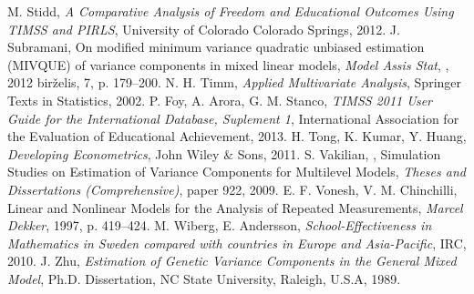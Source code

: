 \documentclass[11pt,a4paper]{article}
\begin{document}
\begin{thebibliography}{1}
 M. Stidd, \textit{A Comparative Analysis of Freedom and Educational Outcomes Using TIMSS and PIRLS}, University of Colorado Colorado Springs, 2012.
J. Subramani, On modified minimum variance quadratic unbiased estimation (MIVQUE) of variance components in mixed linear models, \textit{Model Assis Stat}, , 2012 birželis, 7, p. 179–200.
N. H. Timm, \textit{Applied Multivariate Analysis}, Springer Texts in Statistics, 2002.
 P. Foy, A. Arora, G. M. Stanco, \textit{TIMSS 2011 User Guide for the International Database, Suplement 1}, International Association for the Evaluation of Educational Achievement, 2013.
H. Tong, K. Kumar, Y. Huang, \textit{Developing Econometrics}, John Wiley \& Sons, 2011.
 S. Vakilian, , Simulation Studies on Estimation of Variance Components for Multilevel Models, \textit{Theses and Dissertations (Comprehensive)}, paper 922, 2009.
  E. F. Vonesh, V. M. Chinchilli, Linear and Nonlinear Models for the Analysis of Repeated Measurements, \textit{ Marcel Dekker}, 1997, p. 419–424.
 M. Wiberg, E. Andersson, \textit{School-Effectiveness in Mathematics in Sweden compared with countries in Europe and Asia-Pacific}, IRC, 2010.
 J. Zhu, \textit{Estimation of Genetic Variance Components in the General Mixed Model},  Ph.D.
Dissertation, NC State University, Raleigh, U.S.A, 1989.
\end{thebibliography}
\end{document}
